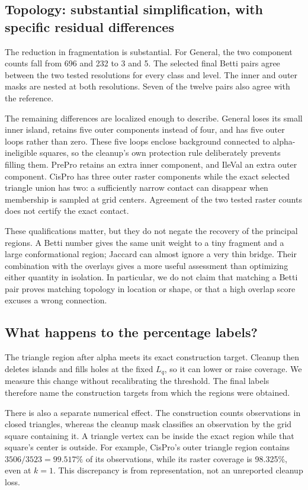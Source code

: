 \documentclass[11pt]{article}
\begin{document}
\subsection{Topology: substantial simplification, with specific residual differences}

The reduction in fragmentation is substantial. For General, the two
component counts fall from 696 and 232 to 3 and 5. The selected final
Betti pairs agree between the two tested resolutions for every class and
level. The inner and outer masks are nested at both resolutions. Seven
of the twelve pairs also agree with the reference.

The remaining differences are localized enough to describe. General loses
its small inner island, retains five outer components instead of four,
and has five outer loops rather than zero. These five loops enclose
background connected to alpha-ineligible squares, so the cleanup's own
protection rule deliberately prevents filling them. PrePro retains an
extra inner component, and IleVal an extra outer component. CisPro has
three outer raster components while the exact selected triangle union has
two: a sufficiently narrow contact can disappear when membership is
sampled at grid centers. Agreement of the two tested raster counts does
not certify the exact contact.

These qualifications matter, but they do not negate the recovery of the
principal regions. A Betti number gives the same unit weight to a tiny
fragment and a large conformational region; Jaccard can almost ignore a
very thin bridge. Their combination with the overlays gives a more useful
assessment than optimizing either quantity in isolation. In particular,
we do not claim that matching a Betti pair proves matching topology in
location or shape, or that a high overlap score excuses a wrong connection.

\subsection{What happens to the percentage labels?}

The triangle region after alpha meets its exact construction target.
Cleanup then deletes islands and fills holes at the fixed $L_q$, so it can
lower or raise coverage. We measure this change without recalibrating the
threshold. The final labels therefore name the construction targets from
which the regions were obtained.

There is also a separate numerical effect. The construction counts
observations in closed triangles, whereas the cleanup mask classifies an
observation by the grid square containing it. A triangle vertex can be
inside the exact region while that square's center is outside. For
example, CisPro's outer triangle region contains $3506/3523=99.517\%$ of
its observations, while its raster coverage is 98.325\%, even at $k=1$.
This discrepancy is from representation, not an unreported cleanup loss.
\end{document}
